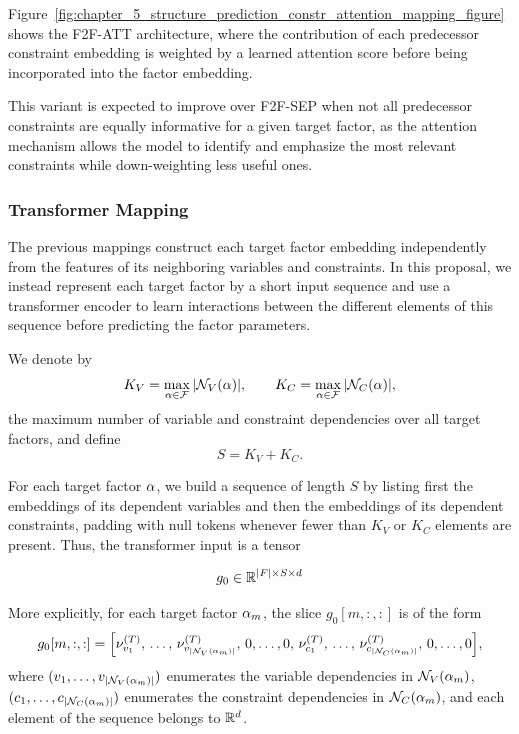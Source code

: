 Figure~\ref{fig:chapter_5_structure_prediction_constr_attention_mapping_figure} shows the F2F-ATT architecture, where the contribution of each predecessor constraint embedding is weighted by a learned attention score before being incorporated into the factor embedding.

This variant is expected to improve over F2F-SEP when not all predecessor constraints are equally informative for a given target factor, as the attention mechanism allows the model to identify and emphasize the most relevant constraints while down-weighting less useful ones.



\subsubsection{Transformer Mapping}
\label{sssec:chapter_5_variant_p3}

The previous mappings construct each target factor embedding independently from the features of its neighboring variables and constraints. In this proposal, we instead represent each target factor by a short input sequence and use a transformer encoder to learn interactions between the different elements of this sequence before predicting the factor parameters.


We denote by
\[
K_V = \max_{\alpha \in \mathcal{F}} |\mathcal N_V(\alpha)|,
\qquad
K_C = \max_{\alpha \in \mathcal{F}} |\mathcal N_C(\alpha)|,
\]
the maximum number of variable and constraint dependencies over all target factors, and define
\[
S = K_V + K_C .
\]

For each target factor $\alpha$, we build a sequence of length $S$ by listing first the embeddings of its dependent variables and then the embeddings of its dependent constraints, padding with null tokens whenever fewer than $K_V$ or $K_C$ elements are present. Thus, the transformer input is a tensor

$$g_0 \in \mathbb{R}^{|F| \times S \times d}$$

More explicitly, for each target factor $\alpha_m$, the slice $g_0[m,:,:]$ is of the form
\begin{equation}
g_0[m,:,:]
=
\Big[
\nu^{(T)}_{v_1},\,
\ldots,\,
\nu^{(T)}_{v_{|\mathcal N_V(\alpha_m)|}},\,
0,\ldots,0,\,
\nu^{(T)}_{c_1},\,
\ldots,\,
\nu^{(T)}_{c_{|\mathcal N_C(\alpha_m)|}},\,
0,\ldots,0
\Big],
\end{equation}
where $(v_1,\dots,v_{|\mathcal N_V(\alpha_m)|})$ enumerates the variable dependencies in $\mathcal N_V(\alpha_m)$, $(c_1,\dots,c_{|\mathcal N_C(\alpha_m)|})$ enumerates the constraint dependencies in $\mathcal N_C(\alpha_m)$, and each element of the sequence belongs to $\mathbb{R}^d$.


